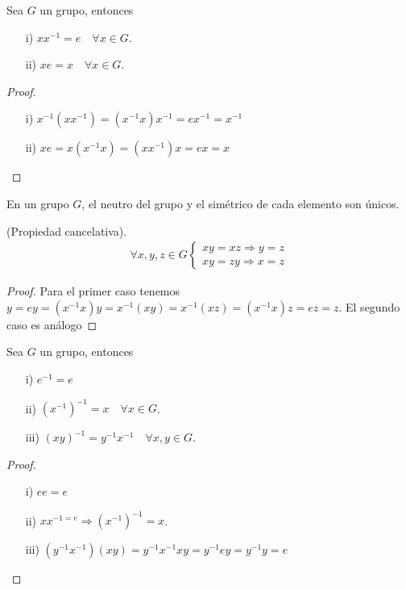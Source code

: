 \begin{lema}
    Sea $G$ un grupo, entonces
    \begin{enumerate}
        \item[i)] $xx^{-1} = e$\ \ $\forall x \in G$.
        \item[ii)] $x e = x$\ \ $\forall x \in G$.
    \end{enumerate}
    \begin{proof}\
        \begin{enumerate}
            \item[i)] $x^{-1}(x x^{-1}) = (x^{-1} x)x^{-1} = e x^{-1} = x^{-1}$
            \item[ii)] $xe = x(x^{-1}x) = (x x^{-1})x = ex = x$ 
        \end{enumerate}
    \end{proof}
\end{lema}

\begin{lema}
    En un grupo $G$, el neutro del grupo y el simétrico de cada elemento son únicos.
\end{lema}

\begin{lema}
    (Propiedad cancelativa). \
    \begin{align*}
        \forall x,y,z\in G \left\{
        \begin{array}{l}
            xy = xz \Rightarrow y=z\\
            xy = zy \Rightarrow x=z
        \end{array}
        \right.
    \end{align*}
    \begin{proof}
        Para el primer caso tenemos $y=ey=(x^{-1}x)y = x^{-1}(xy)=x^{-1}(xz)=(x^{-1}x)z = ez = z$. El segundo caso es análogo %
    \end{proof}
\end{lema}

\begin{lema}
    Sea $G$ un grupo, entonces
    \begin{enumerate}
        \item[i)] $e^{-1} = e$
        \item[ii)] $(x^{-1})^{-1}=x$\ \ $\forall x \in G$.
        \item[iii)] $(xy)^{-1} = y^{-1}x^{-1}$\ \ $\forall x,y\in G$.
    \end{enumerate}
    \begin{proof}\
        \begin{enumerate}
            \item[i)] $ee=e$
            \item[ii)] $xx^{-1=e} \Rightarrow (x^{-1})^{-1} = x$.
            \item[iii)] $(y^{-1}x^{-1})(xy) = y^{-1}x^{-1}xy = y^{-1} e y = y^{-1}y = e$
        \end{enumerate}
    \end{proof}
\end{lema}


